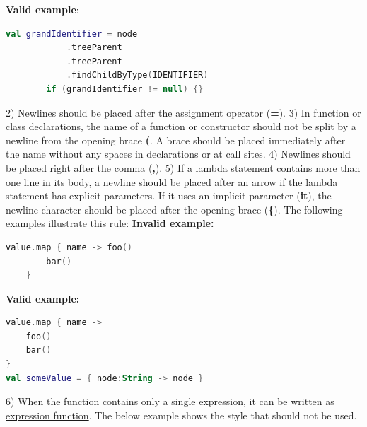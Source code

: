 \textbf{Valid example}:
\begin{lstlisting}[language=Kotlin]
        val grandIdentifier = node
            .treeParent
            .treeParent
            .findChildByType(IDENTIFIER)
        if (grandIdentifier != null) {}
\end{lstlisting}

2)	Newlines should be placed after the assignment operator (\textbf{=}).
3)	In function or class declarations, the name of a function or constructor should not be split by a newline from the opening brace \textbf{(}.
    A brace should be placed immediately after the name without any spaces in declarations or at call sites.
4)	Newlines should be placed right after the comma (\textbf{,}).
5)	If a lambda statement contains more than one line in its body, a newline should be placed after an arrow if the lambda statement has explicit parameters.
    If it uses an implicit parameter (\textbf{it}), the newline character should be placed after the opening brace (\textbf{\{}).
    The following examples illustrate this rule:
\textbf{Invalid example:}
\begin{lstlisting}[language=Kotlin]
    value.map { name -> foo()
        bar()
    }
\end{lstlisting}
\textbf{Valid example:}
\begin{lstlisting}[language=Kotlin]
value.map { name ->
    foo()
    bar()
}
val someValue = { node:String -> node }
\end{lstlisting}
6) When the function contains only a single expression, it can be written as \href{https://kotlinlang.org/docs/reference/functions.html#single-expression-functions}{expression function}.
   The below example shows the style that should not be used.

